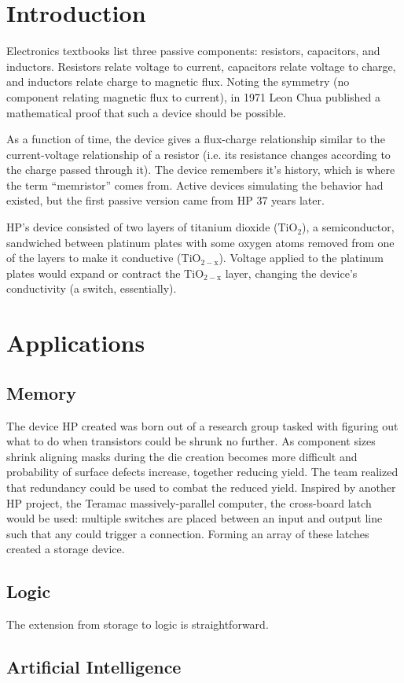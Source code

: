 \documentclass[12pt]{article}
\begin{document}
\maketitle


\section{Introduction}
Electronics textbooks list three passive components: resistors,
capacitors, and inductors.  Resistors relate voltage to current,
capacitors relate voltage to charge, and inductors relate charge to
magnetic flux.  Noting the symmetry (no component relating magnetic
flux to current), in 1971 Leon Chua published a mathematical
proof\cite{chua1971} that such a device should be possible.

As a function of time, the device gives a flux-charge relationship
similar to the current-voltage relationship of a resistor (i.e. its
resistance changes according to the charge passed through it).  The
device remembers it's history, which is where the term ``memristor''
comes from.  Active devices simulating the behavior had existed, but
the first passive version came from HP 37 years
later.\cite{strukov2008missing}

HP's device consisted of two layers of titanium dioxide
($\mathrm{TiO_2}$), a semiconductor, sandwiched between platinum
plates with some oxygen atoms removed from one of the layers to make
it conductive ($\mathrm{TiO_{2-x}}$).  Voltage applied to the platinum
plates would expand or contract the $\mathrm{TiO_{2-x}}$ layer,
changing the device's conductivity\cite{williams2008we} (a switch,
essentially).

\section{Applications}

\subsection{Memory}\label{memory}
The device HP created was born out of a research group tasked with
figuring out what to do when transistors could be shrunk no
further\cite{williams2008we}.  As component sizes shrink aligning
masks during the die creation becomes more difficult and probability
of surface defects increase, together reducing
yield\cite{snider2008molecular}.  The team realized that redundancy
could be used to combat the reduced yield.  Inspired by another HP
project, the Teramac\cite{heath1998} massively-parallel computer, the
cross-board latch would be used: multiple switches are placed between
an input and output line such that any could trigger a connection.
Forming an array of these latches created a storage device.

\subsection{Logic}\label{logic}
The extension from storage to logic is straightforward.

\subsection{Artificial Intelligence}\label{ai}



\end{document}
